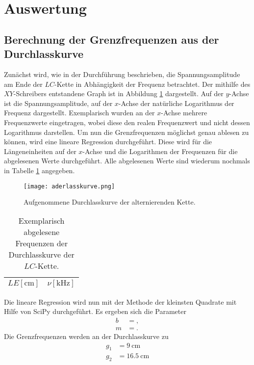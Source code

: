 \section{Auswertung}
\label{sec:Auswertung}
\subsection{Berechnung der Grenzfrequenzen aus der Durchlasskurve}
Zunächst wird, wie in der Durchführung beschrieben, die Spannungsamplitude am Ende der $LC$-Kette in Abhängigkeit der Frequenz betrachtet.
Der mithilfe des $XY$-Schreibers entstandene Graph ist in Abbildung \ref{fig:durchlass} dargestellt.
Auf der $y$-Achse ist die Spannungsamplitude, auf der $x$-Achse der natürliche Logarithmus der Frequenz dargestellt.
Exemplarisch wurden an der $x$-Achse mehrere Frequenzwerte eingetragen, wobei diese den realen Frequenzwert und nicht dessen Logarithmus darstellen.
Um nun die Grenzfrequenzen möglichst genau ablesen zu können, wird eine lineare Regression durchgeführt.
Diese wird für die Längeneinheiten auf der $x$-Achse und die Logarithmen der Frequenzen für die abgelesenen Werte durchgeführt.
Alle abgelesenen Werte sind wiederum nochmals in Tabelle \ref{tab:durchlass} angegeben.\\
\begin{figure}
  \centering
  \texttt{[image: aderlasskurve.png]}
  \caption{Aufgenommene Durchlasskurve der alternierenden Kette.}
  \label{fig:durchlass}
\end{figure}
\begin{table}
  \centering
  \caption{Exemplarisch abgelesene Frequenzen der Durchlasskurve der $LC$-Kette.}
  \label{tab:durchlass}
  \begin{tabular}{c c}
    \toprule
    {$LE [\si{\centi\metre}]$} & {$\nu [\si{\kilo\hertz}]$}\\
    \midrule
    
    \bottomrule
  \end{tabular}
\end{table}
Die lineare Regression wird nun mit der Methode der kleinsten Quadrate mit Hilfe von SciPy durchgeführt.
Es ergeben sich die Parameter
\begin{align*}
  b &= , \\
  m &= .
\end{align*}
Die Grenzfrequenzen werden an der Durchlasskurve zu
\begin{align*}
  g_1 &= \SI{9}{\centi\metre} \\
  g_2 &= \SI{16.5}{\centi\metre}
\end{align*}
